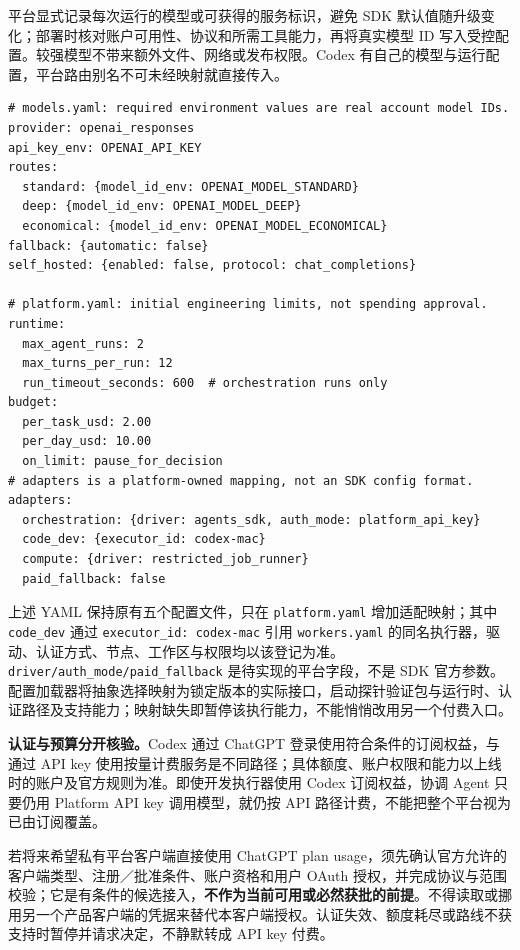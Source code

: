 \documentclass[11pt,a4paper]{article}
\begin{document}
平台显式记录每次运行的模型或可获得的服务标识，避免 SDK 默认值随升级变化；部署时核对账户可用性、协议和所需工具能力，再将真实模型 ID 写入受控配置。较强模型不带来额外文件、网络或发布权限。Codex 有自己的模型与运行配置，平台路由别名不可未经映射就直接传入。\cite{rdRuntimeModels}

\par\noindent\begin{minipage}{\linewidth}
\begin{lstlisting}[caption={models.yaml 与 platform.yaml 中的拟定预算项}]
# models.yaml: required environment values are real account model IDs.
provider: openai_responses
api_key_env: OPENAI_API_KEY
routes:
  standard: {model_id_env: OPENAI_MODEL_STANDARD}
  deep: {model_id_env: OPENAI_MODEL_DEEP}
  economical: {model_id_env: OPENAI_MODEL_ECONOMICAL}
fallback: {automatic: false}
self_hosted: {enabled: false, protocol: chat_completions}

# platform.yaml: initial engineering limits, not spending approval.
runtime:
  max_agent_runs: 2
  max_turns_per_run: 12
  run_timeout_seconds: 600  # orchestration runs only
budget:
  per_task_usd: 2.00
  per_day_usd: 10.00
  on_limit: pause_for_decision
# adapters is a platform-owned mapping, not an SDK config format.
adapters:
  orchestration: {driver: agents_sdk, auth_mode: platform_api_key}
  code_dev: {executor_id: codex-mac}
  compute: {driver: restricted_job_runner}
  paid_fallback: false
\end{lstlisting}
\end{minipage}\par


上述 YAML 保持原有五个配置文件，只在 \texttt{platform.yaml} 增加适配映射；其中 \texttt{code\_dev} 通过 \texttt{executor\_id: codex-mac} 引用 \texttt{workers.yaml} 的同名执行器，驱动、认证方式、节点、工作区与权限均以该登记为准。\texttt{driver/auth\_mode/paid\_fallback} 是待实现的平台字段，不是 SDK 官方参数。配置加载器将抽象选择映射为锁定版本的实际接口，启动探针验证包与运行时、认证路径及支持能力；映射缺失即暂停该执行能力，不能悄悄改用另一个付费入口。

\textbf{认证与预算分开核验。}Codex 通过 ChatGPT 登录使用符合条件的订阅权益，与通过 API key 使用按量计费服务是不同路径；具体额度、账户权限和能力以上线时的账户及官方规则为准。即使开发执行器使用 Codex 订阅权益，协调 Agent 只要仍用 Platform API key 调用模型，就仍按 API 路径计费，不能把整个平台视为已由订阅覆盖。\cite{v121-codex-auth}

若将来希望私有平台客户端直接使用 ChatGPT plan usage，须先确认官方允许的客户端类型、注册／批准条件、账户资格和用户 OAuth 授权，并完成协议与范围校验；它是有条件的候选接入，\textbf{不作为当前可用或必然获批的前提}。不得读取或挪用另一个产品客户端的凭据来替代本客户端授权。认证失效、额度耗尽或路线不获支持时暂停并请求决定，不静默转成 API key 付费。\cite{v121-plan-quickstart}
\end{document}
